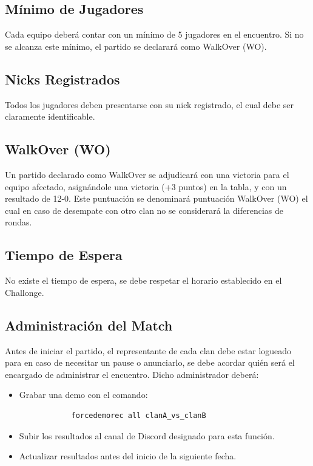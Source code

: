 \documentclass[a4paper, 11pt]{article}
\begin{document}
    \subsection{Mínimo de Jugadores}
    Cada equipo deberá contar con un mínimo de 5 jugadores en el encuentro. Si no se alcanza este mínimo, el partido se declarará como WalkOver (WO).

    \subsection{Nicks Registrados}
    Todos los jugadores deben presentarse con su nick registrado, el cual debe ser claramente identificable.

    \subsection{WalkOver (WO)}
    Un partido declarado como WalkOver se adjudicará con una victoria para el equipo afectado, asignándole una victoria (+3 puntos) en la tabla, y con un resultado de 12-0. Este puntuación se denominará puntuación WalkOver (WO) el cual en caso de desempate con otro clan no se considerará la diferencias de rondas.

    \subsection{Tiempo de Espera}
    No existe el tiempo de espera, se debe respetar el horario establecido en el Challonge.

    \subsection{Administración del Match}
    Antes de iniciar el partido, el representante de cada clan debe estar logueado para en caso de necesitar un pause o anunciarlo, se debe acordar quién será el encargado de administrar el encuentro. Dicho administrador deberá:

    \begin{itemize}
        \item Grabar una demo con el comando:
        \begin{lstlisting}
            forcedemorec all clanA_vs_clanB
        \end{lstlisting}
        \item Subir los resultados al canal de Discord designado para esta función.
        \item Actualizar resultados antes del inicio de la siguiente fecha.
    \end{itemize}
\end{document}
